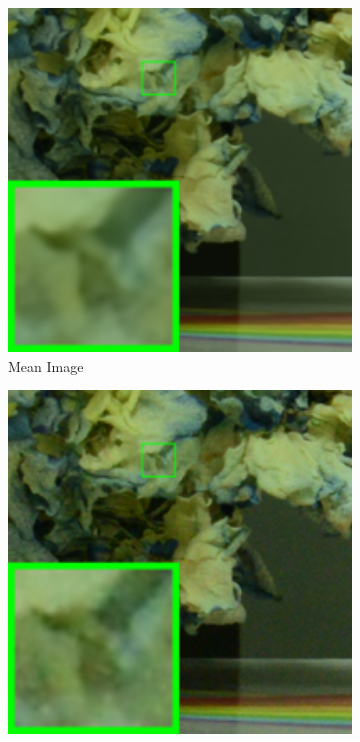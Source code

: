 \begin{figure}
    \centering
    \begin{subfigure}[t]{0.19\textwidth}
        \centering
        \includegraphics[width=1\textwidth]{images/twsc/cc/resize_br_Mean_d800_iso1600_1_real.png}
		\caption{Mean Image}
    \end{subfigure}
    \hfill
    \begin{subfigure}[t]{0.19\textwidth}
        \centering
        \includegraphics[width=1\textwidth]{images/twsc/cc/resize_br_Noisy_d800_iso1600_1_real.png}

\end{subfigure}
\end{figure}
